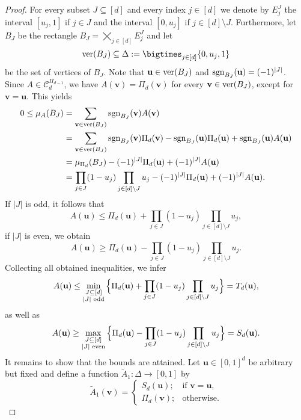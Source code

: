 \documentclass[12pt,a4paper]{amsart}
\theoremstyle{definition}
\newcommand{\kc}{\mathcal{C}}
\begin{document}
\begin{proof}
For every subset $J \subseteq [d]$ and every index $j \in [d]$ we denote by $E_j^J$ the interval $[u_j,1]$ if $j \in J$ and the interval $[0, u_j]$ if $j \in [d] \setminus J$. Furthermore, let $B_J$ be the rectangle $B_J = \displaystyle\bigtimes_{j \in [d]} E_j^J$ and let 
$$\textup{ver}(B_J) \subseteq \Delta := \bigtimes_{j \in [d]} \{0, u_j, 1\}$$ 
be the set of vertices of $B_J$. Note that $\mathbf{u} \in \textup{ver}(B_J)$ and $\textup{sgn}_{B_J}(\mathbf{u}) = (-1)^{|J|}$. Since $A \in \kc_d^{\Pi_{d-1}}$, we have $A(\mathbf{v}) = \Pi_d(\mathbf{v})$ for every
$\mathbf{v} \in \textup{ver}(B_J)$, except for $\mathbf{v} = \mathbf{u}$. 
This yields
\begin{align*}
    0 \le \mu_A(B_J) &= \sum_{\mathbf{v} \in \textup{ver}(B_J)} \textup{sgn}_{B_J}(\mathbf{v})A(\mathbf{v}) \\
     &= \sum_{\mathbf{v} \in \textup{ver}(B_J)} \textup{sgn}_{B_J}(\mathbf{v})\Pi_d(\mathbf{v}) - \textup{sgn}_{B_J}(\mathbf{u})\Pi_d(\mathbf{u}) + \textup{sgn}_{B_J}(\mathbf{u})A(\mathbf{u}) \\
     &= \mu_{\Pi_d}(B_J) - (-1)^{|J|}\Pi_d(\mathbf{u}) + (-1)^{|J|}A(\mathbf{u}) \\
     &= \prod_{j \in J} (1-u_j) \prod_{j \in [d] \setminus J} u_j - (-1)^{|J|}\Pi_d(\mathbf{u}) + (-1)^{|J|}A(\mathbf{u}).
\end{align*}
If $|J|$ is odd, it follows that
$$A(\mathbf{u}) \le \Pi_d(\mathbf{u}) + \prod_{j \in J} (1-u_j) \prod_{j \in [d] \setminus J} u_j,$$
if $|J|$ is even, we obtain
$$A(\mathbf{u}) \ge \Pi_d(\mathbf{u}) - \prod_{j \in J} (1-u_j) \prod_{j \in [d] \setminus J} u_j.$$
Collecting all obtained inequalities, we infer
$$A(\mathbf{u}) \le \min_{\substack{J \subseteq [d]\\ |J| \textup{ odd}}} \Big\{\Pi_d(\mathbf{u}) + \prod_{j \in J} (1-u_j) \prod_{j \in [d] \setminus J} u_j\Big\} = T_d(\mathbf{u}),$$
as well as 
$$A(\mathbf{u}) \ge \max_{\substack{J \subseteq [d]\\ |J| \textup{ even}}} \Big\{\Pi_d(\mathbf{u}) - \prod_{j \in J} (1-u_j) \prod_{j \in [d] \setminus J} u_j\Big\} = S_d(\mathbf{u}).$$
It remains to show that the bounds are attained. Let $\mathbf{u} \in [0,1]^d$ be arbitrary but fixed and define a function $\widetilde{A}_1 \colon \Delta \to [0,1]$ by 
$$\widetilde{A}_1(\mathbf{v}) = \begin{cases} S_d(\mathbf{u}); & \text{if } \mathbf{v} = \mathbf{u}, \\
\Pi_d(\mathbf{v}); & \text{otherwise.} 

\end{cases}$$
\end{proof}
\end{document}
